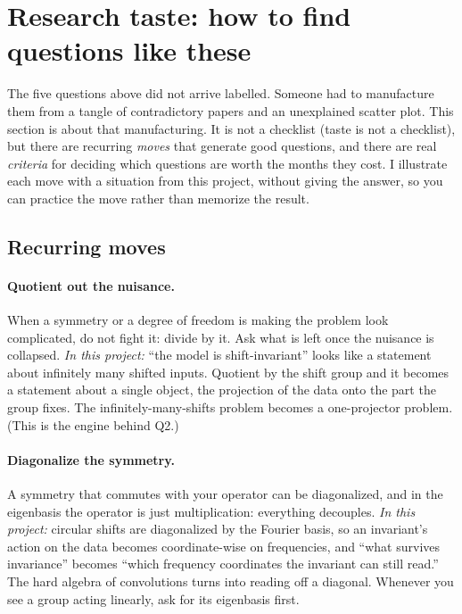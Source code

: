 \section{Research taste: how to find questions like these}
\label{sec:p2-taste}

The five questions above did not arrive labelled. Someone had to manufacture them from a tangle of
contradictory papers and an unexplained scatter plot. This section is about that manufacturing.
It is not a checklist (taste is not a checklist), but there are recurring \emph{moves} that
generate good questions, and there are real \emph{criteria} for deciding which questions are worth
the months they cost. I illustrate each move with a situation from this project, without giving the
answer, so you can practice the move rather than memorize the result.

\subsection{Recurring moves}
\label{sub:p2-moves}

\paragraph{Quotient out the nuisance.} When a symmetry or a degree of freedom is making the problem
look complicated, do not fight it: divide by it. Ask what is left once the nuisance is collapsed.
\emph{In this project:} ``the model is shift-invariant'' looks like a statement about infinitely many
shifted inputs. Quotient by the shift group and it becomes a statement about a single object, the
projection of the data onto the part the group fixes. The infinitely-many-shifts problem becomes a
one-projector problem. (This is the engine behind Q2.)

\paragraph{Diagonalize the symmetry.} A symmetry that commutes with your operator can be diagonalized,
and in the eigenbasis the operator is just multiplication: everything decouples. \emph{In this
project:} circular shifts are diagonalized by the Fourier basis, so an invariant's action on the data
becomes coordinate-wise on frequencies, and ``what survives invariance'' becomes ``which frequency
coordinates the invariant can still read.'' The hard algebra of convolutions turns into reading off a
diagonal. Whenever you see a group acting linearly, ask for its eigenbasis first.

